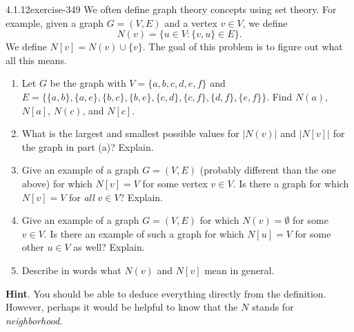 \documentclass[twoside,11pt,]{book}
\numberwithin{equation}{chapter}
\newcommand{\st}{:}
\begin{document}
\begin{divisionsolution}{4.1.12}{}{exercise-349}%
\hypertarget{p-4469}{}%
We often define graph theory concepts using set theory.  For example, given a graph \(G = (V, E)\) and a vertex \(v \in V\), we define%
\begin{equation*}
N(v) = \{u \in V \st \{v,u\} \in E\}\text{.}
\end{equation*}
We define \(N[v] = N(v) \cup \{v\}\).  The goal of this problem is to figure out what all this means.\leavevmode%
\begin{enumerate}[label=(\alph*)]
\item\hypertarget{li-2243}{}\hypertarget{p-4470}{}%
Let \(G\) be the graph with \(V = \{a,b,c,d,e,f\}\) and \(E = \{\{a,b\}, \{a,e\},\{b, c\}, \{b,e\}, \{c,d\}, \{c, f\}, \{d, f\}, \{e,f\}\}\).  Find \(N(a)\), \(N[a]\), \(N(c)\), and \(N[c]\).%
\item\hypertarget{li-2244}{}\hypertarget{p-4471}{}%
What is the largest and smallest possible values for \(|N(v)|\) and \(|N[v]|\) for the graph in part (a)?  Explain.%
\item\hypertarget{li-2245}{}\hypertarget{p-4472}{}%
Give an example of a graph \(G = (V, E)\) (probably different than the one above) for which \(N[v] = V\) for some vertex \(v \in V\).  Is there a graph for which \(N[v] = V\) for \emph{all} \(v \in V\)?  Explain.%
\item\hypertarget{li-2246}{}\hypertarget{p-4473}{}%
Give an example of a graph \(G = (V,E)\) for which \(N(v) = \emptyset\) for some \(v \in V\).  Is there an example of such a graph for which \(N[u] = V\) for some other \(u \in V\) as well?  Explain.%
\item\hypertarget{li-2247}{}\hypertarget{p-4474}{}%
Describe in words what \(N(v)\) and \(N[v]\) mean in general.%
\end{enumerate}
%
\par\smallskip%
\noindent\textbf{Hint}.\quad%
\hypertarget{p-4475}{}%
You should be able to deduce everything directly from the definition.  However, perhaps it would be helpful to know that the \(N\) stands for \emph{neighborhood}.%
\end{divisionsolution}%
\end{document}
